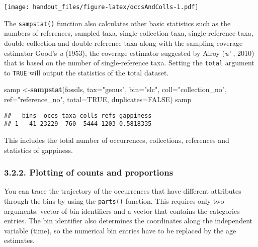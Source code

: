\documentclass[]{article}
\newenvironment{Shaded}{\begin{snugshade}}{\end{snugshade}}
\newcommand{\DataTypeTok}[1]{\textcolor[rgb]{0.13,0.29,0.53}{#1}}
\newcommand{\KeywordTok}[1]{\textcolor[rgb]{0.13,0.29,0.53}{\textbf{#1}}}
\newcommand{\NormalTok}[1]{#1}
\newcommand{\OtherTok}[1]{\textcolor[rgb]{0.56,0.35,0.01}{#1}}
\newcommand{\StringTok}[1]{\textcolor[rgb]{0.31,0.60,0.02}{#1}}
\begin{document}
\texttt{[image: handout\_files/figure-latex/occsAndColls-1.pdf]}

The \texttt{sampstat()} function also calculates other basic statistics
such as the numbers of references, sampled taxa, single-collection taxa,
single-reference taxa, double collection and double reference taxa along
with the sampling coverage estimator Good's \emph{u} (1953), the
coverage estimator suggested by Alroy (\emph{u' }, 2010) that is based
on the number of single-reference taxa. Setting the \texttt{total}
argument to \texttt{TRUE} will output the statistics of the total
dataset.

\begin{Shaded}
\begin{Highlighting}[]
\NormalTok{samp <-}\KeywordTok{sampstat}\NormalTok{(fossils, }\DataTypeTok{tax=}\StringTok{"genus"}\NormalTok{, }\DataTypeTok{bin=}\StringTok{"slc"}\NormalTok{, }
  \DataTypeTok{coll=}\StringTok{"collection_no"}\NormalTok{, }\DataTypeTok{ref=}\StringTok{"reference_no"}\NormalTok{, }\DataTypeTok{total=}\OtherTok{TRUE}\NormalTok{, }\DataTypeTok{duplicates=}\OtherTok{FALSE}\NormalTok{)}
\NormalTok{samp}
\end{Highlighting}
\end{Shaded}

\begin{verbatim}
##   bins  occs taxa colls refs gappiness
## 1   41 23229  760  5444 1203 0.5818335
\end{verbatim}

This includes the total number of occurrences, collections, references
and statistics of gappiness.

\hypertarget{plotting-of-counts-and-proportions}{%
\subsubsection{3.2.2. Plotting of counts and
proportions}\label{plotting-of-counts-and-proportions}}

You can trace the trajectory of the occurrences that have different
attributes through the bins by using the \texttt{parts()} function. This
requires only two arguments: vector of bin identifiers and a vector that
contains the categories entries. The bin identifier also determines the
coordinates along the independent variable (time), so the numerical bin
entries have to be replaced by the age estimates.
\end{document}
